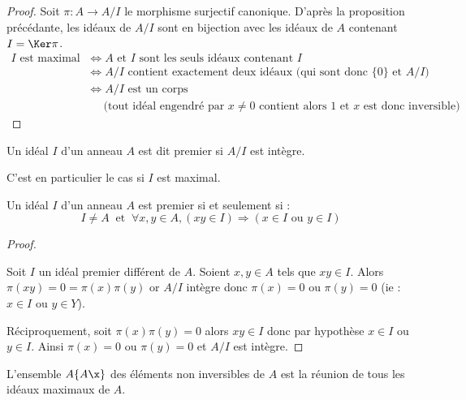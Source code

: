 \begin{proof}
Soit $\pi : A \longrightarrow A/I$ le morphisme surjectif canonique. D'après la
proposition précédante, les idéaux de $A/I$ sont en bijection avec les idéaux
de $A$ contenant $I = \Ker \pi$.
\begin{align*}
 I \text{ est maximal } &\Leftrightarrow A  \text{ et } I  \text{ sont les
seuls idéaux contenant }I\\
&\Leftrightarrow A/I  \text{ contient exactement deux idéaux (qui sont donc }
\{0\}  \text{ et } A/I  \text{)}\\
&\Leftrightarrow A/I  \text{ est un corps} 
\\& \quad\ \: \text{(tout idéal engendré par } x\neq
0 \text{ contient alors }1  \text{ et }x  \text{ est donc inversible)}
\end{align*}

\end{proof}

\begin{defi}
 
Un idéal $I$ d'un anneau $A$ est dit premier si $A/I$ est intègre.
\end{defi}

\begin{example}[Remarque] 
  C'est en
particulier le cas si $I$ est maximal.
\end{example}

\begin{prop}

Un idéal $I$ d'un anneau $A$ est premier si et seulement si :
\begin{displaymath}
 I\neq A \ \text{ et } \ \forall x,y \in A,(xy \in I) \Longrightarrow (x\in I
\text{ ou } y\in I)
\end{displaymath}
\end{prop}

\begin{proof}\

 Soit $I$ un idéal premier différent de $A$. Soient $x,y\in A$ tels que $ xy\in
I$. Alors
$\pi(xy) = 0 = \pi(x)\pi(y)$ or $A/I$ intègre donc $\pi(x) = 0$ ou $\pi(y) = 0$
(ie : $x \in I$ ou $y\in Y$).

Réciproquement, soit $\pi(x)\pi(y) = 0$ alors $xy \in I$ donc par hypothèse
$x\in I$ ou $y\in I$. Ainsi $\pi(x) = 0$ ou $\pi(y) = 0$ et $A/I$ est intègre.
\end{proof}

\begin{prop}
 
L'ensemble $A\-\{A\x\}$ des éléments non inversibles de $A$
est la réunion de tous les idéaux maximaux de $A$.
\end{prop}

